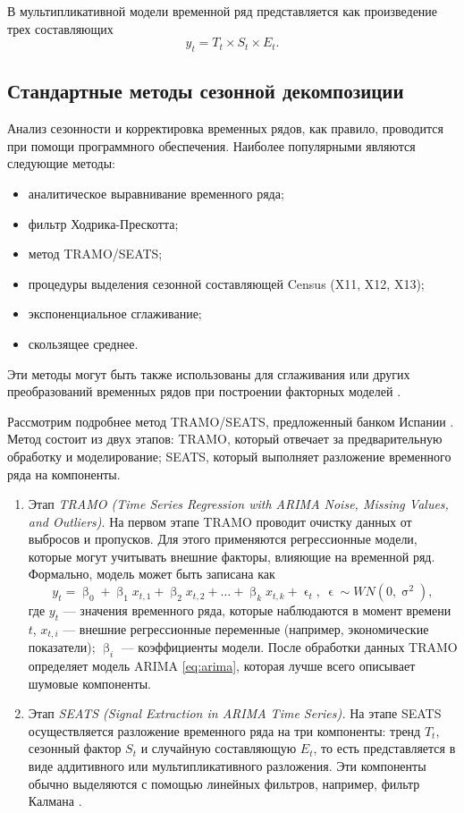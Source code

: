 \documentclass[a4paper, 14pt]{extreport}
\numberwithin{equation}{section}
\renewcommand{\beta}{\upbeta}
\renewcommand{\epsilon}{\upvarepsilon}
\renewcommand{\sigma}{\upsigma}
\numberwithin{equation}{section}
\begin{document}
	В мультипликативной модели временной ряд представляется как произведение трех составляющих
	\begin{equation}
		y_t = T_t \times S_t \times E_t.
	\end{equation}
	\subsection{Стандартные методы сезонной декомпозиции}
	\label{subsec:tramo-seats}
	Анализ сезонности и корректировка временных рядов, как правило, проводится при помощи программного обеспечения. Наиболее популярными являются следующие методы:
	\begin{itemize}
		\item аналитическое выравнивание временного ряда;
		\item фильтр Ходрика-Прескотта;
		\item метод TRAMO/SEATS;
		\item процедуры выделения сезонной составляющей Census (X11, X12, X13);
		\item экспоненциальное сглаживание;
		\item скользящее среднее.
	\end{itemize}
	Эти методы могут быть также использованы для сглаживания или других
	преобразований временных рядов при построении факторных моделей \cite{17}.
	
	Рассмотрим подробнее метод TRAMO/SEATS, предложенный банком Испании \cite{18}. Метод состоит из двух этапов: TRAMO, который отвечает за предварительную обработку и моделирование; SEATS, который выполняет разложение временного ряда на компоненты.
	\begin{enumerate}
		\item Этап \textit{TRAMO (Time Series Regression with ARIMA Noise, Missing Values, and Outliers)}.
		На первом этапе TRAMO проводит очистку данных от выбросов и пропусков. Для этого применяются регрессионные модели, которые могут учитывать внешние факторы, влияющие на временной ряд. Формально, модель может быть записана как
		\begin{equation}
			y_t=\beta_0+\beta_1x_{t,1}+\beta_2x_{t,2}+\dots+\beta_kx_{t,k}+\epsilon_t,\ \epsilon \sim WN(0,\sigma^2),
		\end{equation}
		где $y_t$ --- значения временного ряда, которые наблюдаются в момент времени $t$, $x_{t,i}$ --- внешние регрессионные переменные (например, экономические показатели); $\beta_i$ --- коэффициенты модели.
		После обработки данных TRAMO определяет модель ARIMA \eqref{eq:arima}, которая лучше всего описывает шумовые компоненты.
		\item Этап \textit{SEATS (Signal Extraction in ARIMA Time Series).}
		На этапе SEATS осуществляется разложение временного ряда на три компоненты: тренд $T_t$, сезонный фактор $S_t$ и случайную составляющую $E_t$, то есть представляется в виде аддитивного или мультипликативного разложения. Эти компоненты обычно выделяются с помощью линейных фильтров, например, фильтр Калмана \cite{17}.
	\end{enumerate}
	
\end{document}
